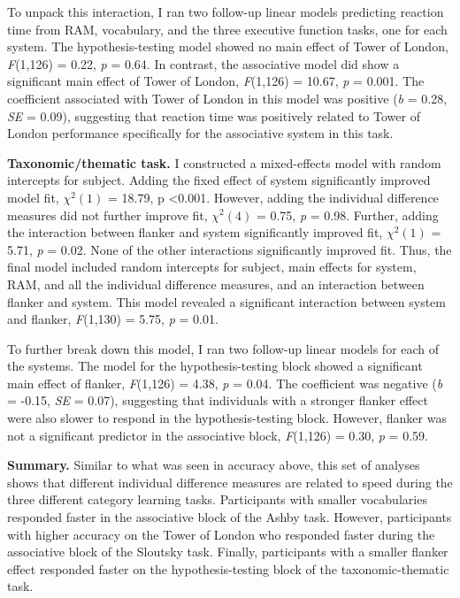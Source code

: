 \documentclass[../dissertation.tex]{subfiles}
\begin{document}
	To unpack this interaction, I ran two follow-up linear models predicting reaction time from RAM, vocabulary, and the three executive function tasks, one for each system. The hypothesis-testing model showed no main effect of Tower of London, \textit{F}(1,126) = 0.22, \textit{p} = 0.64. In contrast, the associative model did show a significant main effect of Tower of London, \textit{F}(1,126) = 10.67, \textit{p} = 0.001. The coefficient associated with Tower of London in this model was positive (\textit{b} = 0.28, \textit{SE} = 0.09), suggesting that reaction time was positively related to Tower of London performance specifically for the associative system in this task. \par
\textbf{Taxonomic/thematic task.}  I constructed a mixed-effects model with random intercepts for subject. Adding the fixed effect of system significantly improved model fit,  $\chi^{2}(1)$ = 18.79, p \textless 0.001. However, adding the individual difference measures did not further improve fit,  $\chi^{2}(4)$ = 0.75, \textit{p} = 0.98. Further, adding the interaction between flanker and system significantly improved fit, $\chi^{2}(1)$ = 5.71, \textit{p} = 0.02. None of the other interactions significantly improved fit. Thus, the final model included random intercepts for subject, main effects for system, RAM, and all the individual difference measures, and an interaction between flanker and system. This model revealed a significant interaction between system and flanker, \textit{F}(1,130) = 5.75, \textit{p} = 0.01. \par 
	To further break down this model, I ran two follow-up linear models for each of the systems. The model for the hypothesis-testing block showed a significant main effect of flanker, \textit{F}(1,126) = 4.38, \textit{p} = 0.04. The coefficient was negative (\textit{b} = -0.15, \textit{SE} = 0.07), suggesting that individuals with a stronger flanker effect were also slower to respond in the hypothesis-testing block. However, flanker was not a significant predictor in the associative block, \textit{F}(1,126) = 0.30, \textit{p} = 0.59.  \par
\textbf{Summary.} Similar to what was seen in accuracy above, this set of analyses shows that different individual difference measures are related to speed during the three different category learning tasks. Participants with smaller vocabularies responded faster in the associative block of the Ashby task. However, participants with higher accuracy on the Tower of London who responded faster during the associative block of the Sloutsky task. Finally, participants with a smaller flanker effect responded faster on the hypothesis-testing block of the taxonomic-thematic task.
\end{document}
